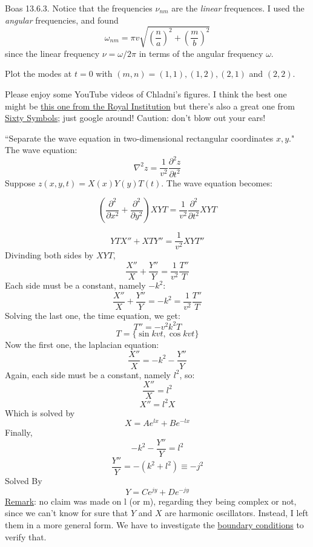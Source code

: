 \documentclass[answers]{exam}\newcommand{\repositoryInformationSetup}{     \usepackage[dvipsnames]{xcolor}     \usepackage[ angle=90, color=black, opacity=1, scale=2, ]{background}      \SetBgPosition{current page.west}      \SetBgVshift{-4.5mm}      \backgroundsetup{contents={{\color{green}\texttt{-{}-} differs from commit \texttt{f3526e2} in 0 files}}} } \newcommand{\commit}{{{\color{green}f3526e2}}}\usepackage{amsmath}
\newcommand{\grad}{\ensuremath{\nabla}\xspace}
\newcommand{\laplacian}{\ensuremath{\grad^2}\xspace}
\begin{document}
\begin{questions}
\begin{solution}
	\end{solution}

	\question Boas 13.6.3.  Notice that the frequencies $\nu_{nm}$ are the \emph{linear} frequences.  I used the \emph{angular} frequencies, and found
	\begin{equation}
		\omega_{nm} = \pi v \sqrt{\left(\frac{n}{a}\right)^2 + \left(\frac{m}{b}\right)^2}
	\end{equation}
	since the linear frequency $\nu = \omega/2\pi$ in terms of the angular frequency $\omega$.

	Plot the modes at $t=0$ with $(m,n)=(1,1), (1,2), (2,1)$ and $(2,2)$.

	Please enjoy some YouTube videos of Chladni's figures.  I think the best one might be \href{https://www.youtube.com/watch?v=OLNFrxgMJ6E}{this one from the Royal Institution} but there's also a great one from \href{https://www.youtube.com/watch?v=dTReFclu_PU}{Sixty Symbols}; just google around!  Caution: don't blow out your ears!

	\begin{solution}
		``Separate the wave equation in two-dimensional rectangular coordinates $x, y$."
		The wave equation:
		$$ \laplacian z = \frac{1}{v^2} \frac{\partial^2 z}{\partial t^2}$$
		Suppose $z(x,y,t) = X(x)Y(y)T(t)$. The wave equation becomes:

		$$ \left( \frac{\partial^2}{\partial x^2} + \frac{\partial^2}{\partial y^2} \right) XYT = \frac{1}{v^2} \frac{\partial^2 }{\partial t^2} XYT$$

		$$ YT X'' + XT Y'' = \frac{1}{v^2} XY T''$$
		Divinding both sides by $XYT$,
		$$ \frac{X''}{X} + \frac{Y''}{Y} = \frac{1}{v^2} \frac{T''}{T}$$
		Each side must be a constant, namely $-k^2$:
		$$ \frac{X''}{X} + \frac{Y''}{Y} = -k^2 = \frac{1}{v^2} \frac{T''}{T}$$
		Solving the last one, the time equation, we get:
		$$ T'' = -v^2 k^2 T$$
		$$ T =  \{ \sin kvt, \cos kvt\}$$
		Now the first one, the laplacian equation:
		$$ \frac{X''}{X}  = -k^2 -  \frac{Y''}{Y} $$
		Again, each side must be a constant, namely $l^2$, so:
		$$ \frac{X''}{X} = l^2$$
		$$ X'' = l^2 X$$
		Which is solved by
		$$ X =  Ae^{lx}+Be^{-lx} $$
		Finally,
		$$ -k^2 -  \frac{Y''}{Y} = l^2 $$
		$$  \frac{Y''}{Y} = -(k^2+l^2) \equiv -j^2$$
		Solved By
		$$ Y = Ce^{jy}+De^{-jy} $$
		\underline{Remark}: no claim was made on l (or m), regarding they being complex or not, since we can't know for sure that $Y$ and $X$ are harmonic oscillators.
		Instead, I left them in a more general form. We have to investigate the \underline{boundary conditions} to verify that.


\end{solution}
\end{questions}
\end{document}
